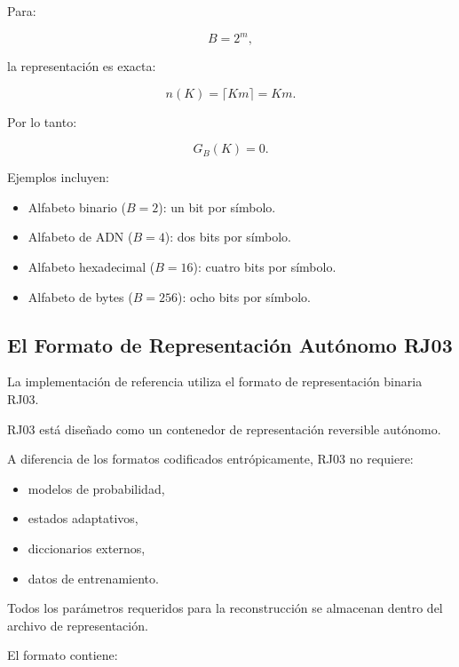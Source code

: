 \documentclass[onecolumn]{IEEEtran}
\begin{document}
Para:

\[
B=2^m ,
\]

la representación es exacta:

\[
n(K)
=
\lceil Km\rceil
=
Km .
\]

Por lo tanto:

\[
G_B(K)=0 .
\]

Ejemplos incluyen:

\begin{itemize}

\item Alfabeto binario ($B=2$): un bit por símbolo.

\item Alfabeto de ADN ($B=4$): dos bits por símbolo.

\item Alfabeto hexadecimal ($B=16$): cuatro bits por símbolo.

\item Alfabeto de bytes ($B=256$): ocho bits por símbolo.

\end{itemize}

\subsection{El Formato de Representación Autónomo RJ03}

La implementación de referencia utiliza el formato de representación
binaria RJ03.

RJ03 está diseñado como un contenedor de representación reversible
autónomo.

A diferencia de los formatos codificados entrópicamente, RJ03 no
requiere:

\begin{itemize}

\item modelos de probabilidad,

\item estados adaptativos,

\item diccionarios externos,

\item datos de entrenamiento.

\end{itemize}

Todos los parámetros requeridos para la reconstrucción se almacenan
dentro del archivo de representación.

El formato contiene:
\end{document}

